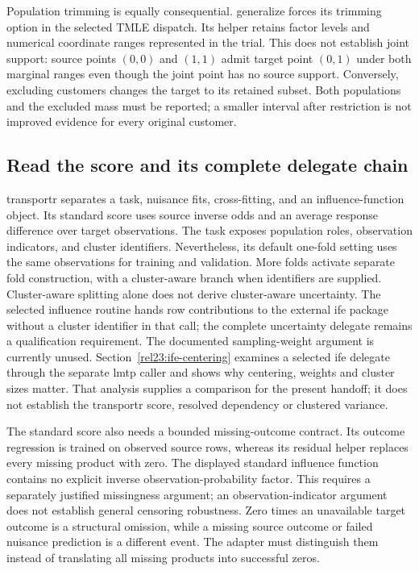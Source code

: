 Population trimming is equally consequential. generalize forces its trimming option in the selected TMLE dispatch. Its helper retains factor levels and numerical coordinate ranges represented in the trial. This does not establish joint support: source points $(0,0)$ and $(1,1)$ admit target point $(0,1)$ under both marginal ranges even though the joint point has no source support. Conversely, excluding customers changes the target to its retained subset. Both populations and the excluded mass must be reported; a smaller interval after restriction is not improved evidence for every original customer.~\citep{exec25_rtm_generalize,exec25_rtm_choice}

\subsection{Read the score and its complete delegate chain}

transportr separates a task, nuisance fits, cross-fitting, and an influence-function object. Its standard score uses source inverse odds and an average response difference over target observations. The task exposes population roles, observation indicators, and cluster identifiers. Nevertheless, its default one-fold setting uses the same observations for training and validation. More folds activate separate fold construction, with a cluster-aware branch when identifiers are supplied. Cluster-aware splitting alone does not derive cluster-aware uncertainty. The selected influence routine hands row contributions to the external ife package without a cluster identifier in that call; the complete uncertainty delegate remains a qualification requirement. The documented sampling-weight argument is currently unused. Section~\ref{rel23:ife-centering} examines a selected ife delegate through the separate lmtp caller and shows why centering, weights and cluster sizes matter. That analysis supplies a comparison for the present handoff; it does not establish the transportr score, resolved dependency or clustered variance.~\citep{exec25_rtm_transportr}

The standard score also needs a bounded missing-outcome contract. Its outcome regression is trained on observed source rows, whereas its residual helper replaces every missing product with zero. The displayed standard influence function contains no explicit inverse observation-probability factor. This requires a separately justified missingness argument; an observation-indicator argument does not establish general censoring robustness. Zero times an unavailable target outcome is a structural omission, while a missing source outcome or failed nuisance prediction is a different event. The adapter must distinguish them instead of translating all missing products into successful zeros.~\citep{exec25_rtm_transportr}

